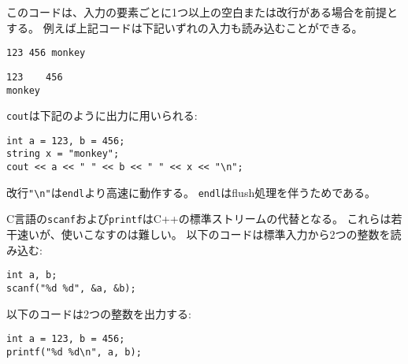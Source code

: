 このコードは、入力の要素ごとに1つ以上の空白または改行がある場合を前提とする。
例えば上記コードは下記いずれの入力も読み込むことができる。

\begin{lstlisting}
123 456 monkey
\end{lstlisting}
\begin{lstlisting}
123    456
monkey
\end{lstlisting}

\begin{comment}
The \texttt{cout} stream is used for output
as follows:
\end{comment}

\texttt{cout}は下記のように出力に用いられる:
\begin{lstlisting}
int a = 123, b = 456;
string x = "monkey";
cout << a << " " << b << " " << x << "\n";
\end{lstlisting}

\begin{comment}
Input and output is sometimes
a bottleneck in the program.
The following lines at the beginning of the code
make input and output more efficient:
\begin{comment}

入出力はしばしばプログラムのボトルネックになりうる。
下記をコードの先頭で実行することで、入出力効率は向上する。

\begin{lstlisting}
ios::sync_with_stdio(0);
cin.tie(0);
\end{lstlisting}

\begin{comment}
Note that the newline \texttt{"\textbackslash n"}
works faster than \texttt{endl},
because \texttt{endl} always causes
a flush operation.

The C functions \texttt{scanf}
and \texttt{printf} are an alternative
to the C++ standard streams.
They are usually a bit faster,
but they are also more difficult to use.
The following code reads two integers from the input:
\end{comment}

改行\texttt{"\textbackslash n"}は\texttt{endl}より高速に動作する。
\texttt{endl}はflush処理を伴うためである。

C言語の\texttt{scanf}および\texttt{printf}はC++の標準ストリームの代替となる。
これらは若干速いが、使いこなすのは難しい。
以下のコードは標準入力から2つの整数を読み込む:

\begin{lstlisting}
int a, b;
scanf("%d %d", &a, &b);
\end{lstlisting}
\begin{comment}
The following code prints two integers:
\end{comment}
以下のコードは2つの整数を出力する:
\begin{lstlisting}
int a = 123, b = 456;
printf("%d %d\n", a, b);
\end{lstlisting}

